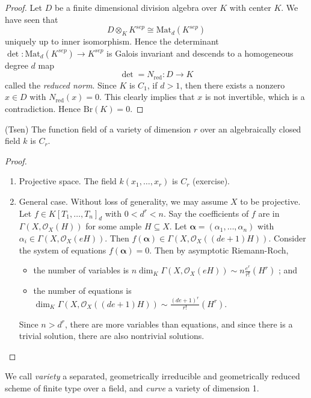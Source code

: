 \begin{proof} 
Let $D$ be a finite dimensional division algebra over $K$ with center $K$. We 
have seen that
$$
D \otimes_K K^{sep} \cong \text{Mat}_d(K^{sep})
$$
uniquely up to inner isomorphism. Hence the determinant $\det : 
\text{Mat}_d(K^{sep}) \to K^{sep}$ is Galois invariant and descends to a 
homogeneous degree $d$ map
$$
\det = N_\text{red} : D \longrightarrow K
$$
called the {\it reduced norm}. Since $K$ is $C_1$, if $d > 1$, then there 
exists a nonzero $x \in D$ with $N_\text{red}(x) = 0$. This clearly implies 
that $x$ is not invertible, which is a contradiction. Hence $\text{Br}(K) = 0$.
\end{proof}

\begin{theorem}
\label{theorem-tsen}
(Tsen)
The function field of a variety of dimension $r$ over an algebraically closed 
field $k$ is $C_r$.
\end{theorem}

\begin{proof}
\begin{enumerate}
\item
Projective space. The field $k(x_1, \ldots, x_r)$ is $C_r$ (exercise).
\item
General case. Without loss of generality, we may assume $X$ to be projective. 
Let $f \in K[T_1, \dots, T_n]_d$ with $0 < d^r <n$. Say the coefficients of $f$ 
are in $\Gamma(X,\mathcal{O}_X(H))$ for some ample $H \subseteq X$. Let 
$\mathbf{\alpha} = (\alpha_1, \dots, \alpha_n)$ with $\alpha_i \in \Gamma(X, 
\mathcal{O}_X(eH))$. Then $f(\mathbf{\alpha}) \in \Gamma(X, 
\mathcal{O}_X((de+1)H))$. Consider the system of equations $f(\mathbf{\alpha}) 
=0$. Then by asymptotic Riemann-Roch, 
\begin{itemize}
\item
the number of variables is $n\dim_K \Gamma(X,\mathcal{O}_X(eH)) \sim 
n\frac{e^r}{r!} (H^r)$ ; and
\item
the number of equations is $\dim_K \Gamma(X,\mathcal{O}_X((de+1)H)) \sim 
\frac{(de+1)^r}{r!} (H^r).$
\end{itemize}
Since $n> d^r$, there are more variables than equations, and since there is a 
trivial solution, there are also nontrivial solutions.
\end{enumerate}
\end{proof}

\begin{definition}
\label{definition-variety}
We call {\it variety} a separated, geometrically irreducible and geometrically 
reduced scheme of finite type over a field, and  {\it curve} a variety of 
dimension 1. 
\end{definition}

